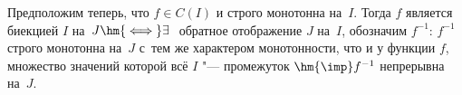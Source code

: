 \label{obnep}
Предположим теперь, что $f\in C(I)$ и строго монотонна на~$I$. Тогда $f$ является биекцией $I$ на~$J\hm{\iff} \exists\  $ обратное
отображение $J$ на~$I$, обозначим $f^{-1}$: $f^{-1}$ строго монотонна на~$J$ с~тем же характером монотонности, что и у функции $f$,
множество значений которой всё $I$ "--- промежуток $\hm{\imp} f^{-1}$ непрерывна на~$J$.
